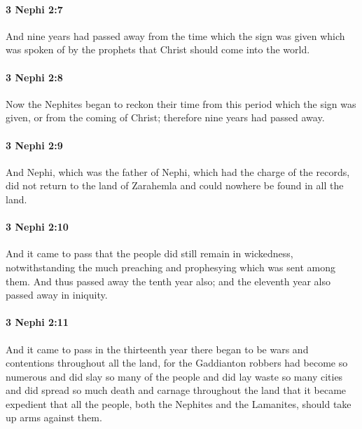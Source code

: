 		\paragraph{3 Nephi 2:7} %
			\label{3NEPHI-2-7}

			And nine years had passed away from the time
			which the sign was given which was spoken of by the prophets
			that Christ should come into the world.

		\paragraph{3 Nephi 2:8} %
			\label{3NEPHI-2-8}

			Now the Nephites began to reckon their time
			from this period which the sign was given, or from the coming of Christ;
			therefore nine years had passed away.

		\paragraph{3 Nephi 2:9} %
			\label{3NEPHI-2-9}

			And Nephi, which was the father of Nephi,
			which had the charge of the records,
			did not return to the land of Zarahemla
			and could nowhere be found in all the land.

		\paragraph{3 Nephi 2:10} %
			\label{3NEPHI-2-10}

			And it came to pass that the people did still remain in wickedness,
			notwithstanding the much preaching and prophesying which was sent among them.
			And thus passed away the tenth year also;
			and the eleventh year also passed away in iniquity.

		\paragraph{3 Nephi 2:11} %
			\label{3NEPHI-2-11}

			And it came to pass in the thirteenth year
			there began to be wars and contentions throughout all the land,
			for the Gaddianton robbers had become so numerous
			and did slay so many of the people
			and did lay waste so many cities
			and did spread so much death and carnage throughout the land
			that it became expedient that all the people,
			both the Nephites and the Lamanites,
			should take up arms against them.

